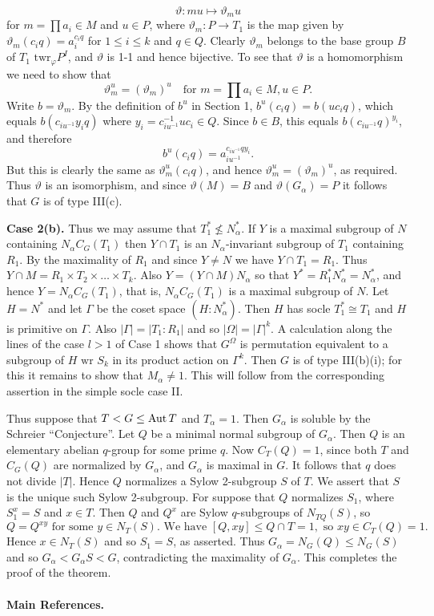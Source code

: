 $$ \vartheta: mu \mapsto \vartheta_m u $$
for $m = \prod a_i \in M$ and $u \in P$, where $\vartheta_m: P \to T_1$ is the map given by $\vartheta_m(c_i q) = a_i^{c_i q}$ for $1 \le i \le k$ and $q \in Q$. Clearly $\vartheta_m$ belongs to the base group $B$ of $T_1 \text{ twr}_\varphi P^I$, and $\vartheta$ is 1-1 and hence bijective. To see that $\vartheta$ is a homomorphism we need to show that
$$ \vartheta_m^u = (\vartheta_m)^u \quad \text{for } m=\prod a_i \in M, u \in P. $$
Write $b = \vartheta_m$. By the definition of $b^u$ in Section 1, $b^u(c_i q) = b(uc_i q)$, which equals $b(c_{iu^{-1}} y_i q)$ where $y_i = c_{iu^{-1}}^{-1} uc_i \in Q$. Since $b \in B$, this equals $b(c_{iu^{-1}} q)^{y_i}$, and therefore
$$ b^u(c_i q) = a_{iu^{-1}}^{c_{iu^{-1}} q y_i}. $$
But this is clearly the same as $\vartheta_m^u(c_i q)$, and hence $\vartheta_m^u = (\vartheta_m)^u$, as required.
Thus $\vartheta$ is an isomorphism, and since $\vartheta(M) = B$ and $\vartheta(G_\alpha) = P$ it follows that $G$ is of type III(c).


\textbf{Case 2(b).} Thus we may assume that $T_1^* \not\le N_\alpha^*$. If $Y$ is a maximal subgroup of $N$ containing $N_\alpha C_G(T_1)$ then $Y \cap T_1$ is an $N_\alpha$-invariant subgroup of $T_1$ containing $R_1$. By the maximality of $R_1$ and since $Y \ne N$ we have $Y \cap T_1 = R_1$. Thus $Y \cap M = R_1 \times T_2 \times \dots \times T_k$. Also $Y = (Y \cap M)N_\alpha$ so that $Y^* = R_1^* N_\alpha^* = N_\alpha^*$, and hence $Y = N_\alpha C_G(T_1)$, that is, $N_\alpha C_G(T_1)$ is a maximal subgroup of $N$. Let $H=N^*$ and let $\Gamma$ be the coset space $(H:N_\alpha^*)$. Then $H$ has socle $T_1^* \cong T_1$ and $H$ is primitive on $\Gamma$. Also $|\Gamma| = |T_1:R_1|$ and so $|\Omega|=|\Gamma|^k$. A calculation along the lines of the case $l>1$ of Case 1 shows that $G^\Omega$ is permutation equivalent to a subgroup of $H \text{ wr } S_k$ in its product action on $\Gamma^k$. Then $G$ is of type III(b)(i); for this it remains to show that $M_\alpha \ne 1$. This will follow from the corresponding assertion in the simple socle case II.

Thus suppose that $T < G \le \operatorname{Aut} T$ and $T_\alpha = 1$. Then $G_\alpha$ is soluble by the Schreier ``Conjecture''. Let $Q$ be a minimal normal subgroup of $G_\alpha$. Then $Q$ is an elementary abelian $q$-group for some prime $q$. Now $C_T(Q)=1$, since both $T$ and $C_G(Q)$ are normalized by $G_\alpha$, and $G_\alpha$ is maximal in $G$. It follows that $q$ does not divide $|T|$. Hence $Q$ normalizes a Sylow 2-subgroup $S$ of $T$. We assert that $S$ is the unique such Sylow 2-subgroup. For suppose that $Q$ normalizes $S_1$, where $S_1^x=S$ and $x \in T$. Then $Q$ and $Q^x$ are Sylow $q$-subgroups of $N_{TQ}(S)$, so
$$Q=Q^{xy} \text{ for some } y \in N_T(S). \text{ We have } [Q,xy] \le Q \cap T = 1, \text{ so } xy \in C_T(Q)=1. $$
Hence $x \in N_T(S)$ and so $S_1=S$, as asserted. Thus $G_\alpha = N_G(Q) \le N_G(S)$ and so $G_\alpha < G_\alpha S < G$, contradicting the maximality of $G_\alpha$.
This completes the proof of the theorem.

\paragraph{Main References.} \cite{Wilson2009,Cameron1999,Smith2018,Liebeck1988,Aschbacher1985}